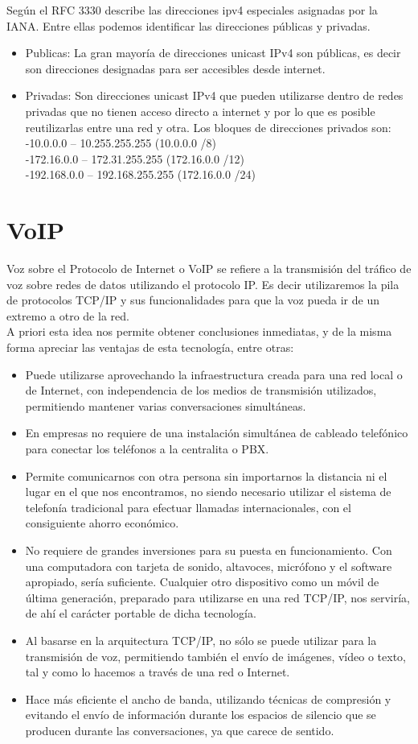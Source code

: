 \documentclass[11pt,fleqn]{book} %
\begin{document}
Según el RFC 3330 describe las direcciones ipv4 especiales asignadas por la IANA. Entre ellas podemos identificar las direcciones públicas y privadas. 
\begin{itemize}
\item Publicas: La gran mayoría de direcciones unicast  IPv4 son públicas, es decir son direcciones designadas para ser accesibles desde internet.

\item Privadas: Son direcciones unicast IPv4 que pueden utilizarse dentro de redes privadas que no tienen acceso directo a internet y por lo que es posible reutilizarlas entre una red y otra. Los bloques de direcciones privados son:
-10.0.0.0 – 10.255.255.255          (10.0.0.0 /8)\\
-172.16.0.0 – 172.31.255.255      (172.16.0.0 /12)\\
-192.168.0.0 – 192.168.255.255   (172.16.0.0 /24)\\
\end{itemize}
\section{VoIP}
Voz sobre el Protocolo de Internet o VoIP se refiere a la transmisión del tráfico de voz sobre redes de datos utilizando el protocolo IP. Es decir utilizaremos la pila de protocolos TCP/IP y sus funcionalidades para que la voz pueda ir de un extremo a otro de la red. \\
A priori esta idea nos permite obtener conclusiones inmediatas, y de la misma forma apreciar las ventajas de esta tecnología, entre otras:
\begin{itemize}
\item Puede utilizarse aprovechando la infraestructura creada para una red local o de Internet, con independencia de los medios de transmisión utilizados, permitiendo mantener varias conversaciones simultáneas.
\item En empresas no requiere de una instalación simultánea de cableado telefónico para conectar los teléfonos a la centralita o PBX.
\item Permite comunicarnos con otra persona sin importarnos la distancia ni el lugar en el que nos encontramos, no siendo necesario utilizar el sistema de telefonía tradicional para efectuar llamadas internacionales, con el consiguiente ahorro económico.
\item No requiere de grandes inversiones para su puesta en funcionamiento. Con una computadora con tarjeta de sonido, altavoces, micrófono y el software apropiado, sería suficiente. Cualquier otro dispositivo como un móvil de última generación, preparado para utilizarse en una red TCP/IP, nos serviría, de ahí el carácter portable de dicha tecnología.
\item Al basarse en la arquitectura TCP/IP, no sólo se puede utilizar para la transmisión de voz, permitiendo también el envío de imágenes, vídeo o texto, tal y como lo hacemos a través de una red o Internet.
\item Hace más eficiente el ancho de banda, utilizando técnicas de compresión y evitando el envío de información durante los espacios de silencio que se producen durante las conversaciones, ya que carece de sentido.
\end{itemize}
\end{document}
